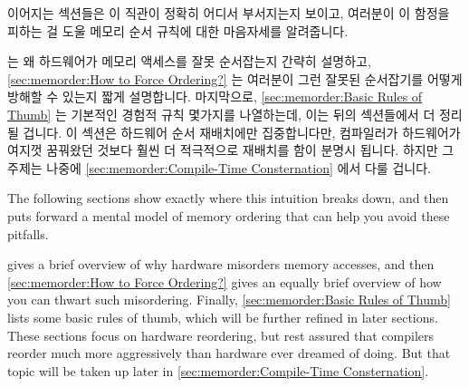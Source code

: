 이어지는 섹션들은 이 직관이 정확히 어디서 부서지는지 보이고, 여러분이 이 함정을
피하는 걸 도울 메모리 순서 규칙에 대한 마음자세를 알려줍니다.

는 왜 하드웨어가 메모리 액세스를 잘못 순서잡는지 간략히 설명하고,
\cref{sec:memorder:How to Force Ordering?}
는 여러분이 그런 잘못된 순서잡기를 어떻게 방해할 수 있는지 짧게 설명합니다.
마지막으로, \cref{sec:memorder:Basic Rules of Thumb}
는 기본적인 경험적 규칙 몇가지를 나열하는데, 이는 뒤의 섹션들에서 더 정리될
겁니다.
이 섹션은 하드웨어 순서 재배치에만 집중합니다만, 컴파일러가 하드웨어가 여지껏
꿈꿔왔던 것보다 훨씬 더 적극적으로 재배치를 함이 분명시 됩니다.
하지만 그 주제는 나중에
\cref{sec:memorder:Compile-Time Consternation} 에서 다룰 겁니다.

\iffalse

The following sections show exactly where this intuition breaks down,
and then puts forward a mental model of memory ordering that can help
you avoid these pitfalls.

gives a brief overview of why hardware misorders memory accesses, and then
\cref{sec:memorder:How to Force Ordering?}
gives an equally brief overview of how you can thwart such misordering.
Finally, \cref{sec:memorder:Basic Rules of Thumb}
lists some basic rules of thumb, which will be further refined in
later sections.
These sections focus on hardware reordering, but rest assured that compilers
reorder much more aggressively than hardware ever dreamed of doing.
But that topic will be taken up later in
\cref{sec:memorder:Compile-Time Consternation}.


